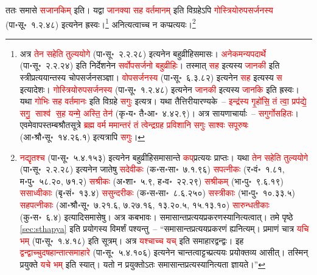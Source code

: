 \begin{sloppypar}
ततः समासे \textcolor{red}{सजानकिम्‌} इति। यद्वा \textcolor{red}{जानक्या सह वर्तमानम्‌} इति विग्रहेऽपि \textcolor{red}{गोस्त्रियोरुप\-सर्जनस्य} (पा॰सू॰~१.२.४८) इत्यनेन ह्रस्वः।\footnote{अत्र \textcolor{red}{तेन सहेति तुल्ययोगे} (पा॰सू॰~२.२.२८) इत्यनेन बहुव्रीहि\-समासः। \textcolor{red}{अनेकमन्यपदार्थे} (पा॰सू॰~२.२.२४) इति निर्देशनेन \textcolor{red}{सर्वोपसर्जनो बहुव्रीहिः}। तस्मात् \textcolor{red}{सह} इत्यस्य \textcolor{red}{जानकी} इति स्त्रीप्रत्ययान्तस्य चोपसर्जन\-सञ्ज्ञा। \textcolor{red}{वोपसर्जनस्य} (पा॰सू॰~६.३.८२) इत्यनेन \textcolor{red}{सह} इत्यस्य \textcolor{red}{स} इत्यादेशः। \textcolor{red}{गोस्त्रियोरुप\-सर्जनस्य} (पा॰सू॰~१.२.४८) इत्यनेन \textcolor{red}{जानकी} इत्यस्य \textcolor{red}{जानकि} इति ह्रस्वः। यथा \textcolor{red}{गोभिः सह वर्तमानः} इति विग्रहे \textcolor{red}{सगुः} इत्यत्र। यथा तैत्तिरीयारण्यके~– \textcolor{red}{इन्द्र॑स्य गृ॒हो॑सि॒ तं त्वा॒ प्रप॑द्ये॒ सगु॒ साश्व॑ स॒ह यन्मे॒ अस्ति॒ तेन॑} (कृ॰य॰ तै॰आ॰~४.४२.९)। अत्र सायणाचार्याः~– \textcolor{red}{सगुर्गोसहितः}। एवमेवापस्तम्ब\-श्रौत\-सूत्रे \textcolor{red}{ब्रह्म वर्म ममान्तरं तं त्वेन्द्रग्रह प्रविशानि सगुः साश्वः सपूरुषः} (आ॰श्रौ॰सू॰~१४.२६.१) इत्यत्रापि \textcolor{red}{सगुः}।} अनित्यत्वाच्च न कप्प्रत्ययः।\footnote{\textcolor{red}{नद्यृतश्च} (पा॰सू॰~५.४.१५३) इत्यनेन बहुव्रीहि\-समासान्ते \textcolor{red}{कप्‌}\-प्रत्ययः प्राप्तः। यथा \textcolor{red}{तेन सहेति तुल्ययोगे} (पा॰सू॰~२.२.२८) इत्यनेन जातेषु \textcolor{red}{सदेवीकः} (क॰स॰सा॰~७.१.९६) \textcolor{red}{सपत्नीकः} (र॰वं॰~१.८१, म॰पु॰~५८.२०, ७१.२) \textcolor{red}{सश्रीकः} (अ॰शा॰~५.९, ह॰व॰~२२.२९) \textcolor{red}{सश्रीकम्} (भा॰पु॰~९.६.१९) \textcolor{red}{ससाध्वीकाः} (बृ॰सं॰~१३.४) \textcolor{red}{ससुन्दरीकः} (क॰स॰सा॰~८.६.२५०) \textcolor{red}{सस्त्रीकाः} (भा॰पु॰~१०.३३.५) \textcolor{red}{सहपत्नीकाः} (आ॰श्रौ॰सू॰~७.२१.६, ७.२७.१६, १३.२०.५, १५.१३.१०) \textcolor{red}{सारुन्धतीकाः} (कु॰स॰~६.४) इत्यादि\-समासेषु। अत्र कबभावः। समासान्त\-प्रत्यय\-प्रकरणस्यानित्यत्वात्। \pageref{sec:sthapya}तमे पृष्ठे \ref{sec:sthapya}  इति प्रयोगस्य विमर्शं पश्यन्तु~– “समासान्त\-प्रत्यय\-प्रकरणं ह्यनित्यम्। प्रमाणं चात्र \textcolor{red}{यचि भम्‌} (पा॰सू॰~१.४.१८) इति सूत्रम्। अत्र \textcolor{red}{यश्चाच्च यच्‌} इति समाहार\-द्वन्द्वः। इह \textcolor{red}{द्वन्द्वाच्चु\-दषहान्तात्समाहारे} (पा॰सू॰~५.४.१०६) इत्यनेन चान्तत्वाट्टच्प्रत्ययः प्रयोक्तव्य आसीत्। तस्मिन् प्रयुक्ते \textcolor{red}{यचे भम्‌} इति स्यात्। यतो न प्रयुक्तोऽतः समासान्त\-प्रत्यस्यानित्यता ज्ञायते।”}\end{sloppypar}
